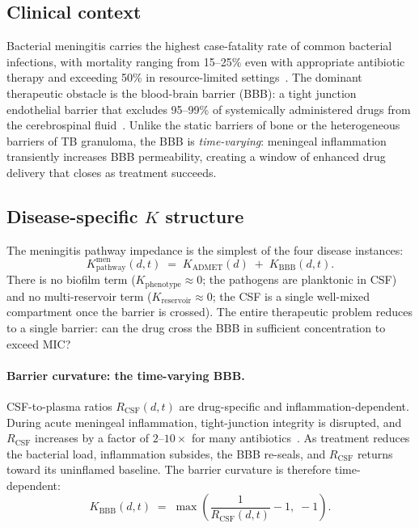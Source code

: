 \documentclass[11pt]{article}
\theoremstyle{plain}
\theoremstyle{definition}
\newcommand{\Kpath}{K_{\mathrm{pathway}}}
\newcommand{\Kpheno}{K_{\mathrm{phenotype}}}
\newcommand{\Kres}{K_{\mathrm{reservoir}}}
\newcommand{\Kadmet}{K_{\mathrm{ADMET}}}
\begin{document}
\subsection{Clinical context}
\label{sec:men-context}

Bacterial meningitis carries the highest case-fatality rate of
common bacterial infections, with mortality ranging from 15--25\%
even with appropriate antibiotic therapy and exceeding 50\% in
resource-limited settings~\cite{vandeBeek2006}. The dominant
therapeutic obstacle is the blood-brain barrier (BBB): a tight
junction endothelial barrier that excludes 95--99\% of
systemically administered drugs from the cerebrospinal
fluid~\cite{Nau2010}. Unlike the static barriers of bone or the
heterogeneous barriers of TB granuloma, the BBB is
\emph{time-varying}: meningeal inflammation transiently increases
BBB permeability, creating a window of enhanced drug delivery that
closes as treatment succeeds.

\subsection{Disease-specific \texorpdfstring{$K$}{K} structure}
\label{sec:men-k}

The meningitis pathway impedance is the simplest of the four
disease instances:
\begin{equation}
  \label{eq:k-men}
  \Kpath^{\mathrm{men}}(d, t) \;=\;
  \Kadmet(d) \;+\; K_{\mathrm{BBB}}(d, t).
\end{equation}
There is no biofilm term ($\Kpheno \approx 0$; the pathogens are
planktonic in CSF) and no multi-reservoir term ($\Kres \approx 0$;
the CSF is a single well-mixed compartment once the barrier is
crossed). The entire therapeutic problem reduces to a single
barrier: can the drug cross the BBB in sufficient concentration
to exceed MIC?

\paragraph{Barrier curvature: the time-varying BBB.}
CSF-to-plasma ratios $R_{\mathrm{CSF}}(d, t)$ are drug-specific
and inflammation-dependent. During acute meningeal inflammation,
tight-junction integrity is disrupted, and $R_{\mathrm{CSF}}$
increases by a factor of $2$--$10\times$ for many
antibiotics~\cite{Nau2010}. As treatment reduces the bacterial
load, inflammation subsides, the BBB re-seals, and
$R_{\mathrm{CSF}}$ returns toward its uninflamed baseline. The
barrier curvature is therefore time-dependent:
\begin{equation}
  \label{eq:k-bbb}
  K_{\mathrm{BBB}}(d, t) \;=\;
  \max\!\left(\frac{1}{R_{\mathrm{CSF}}(d, t)} - 1,\; -1\right).
\end{equation}
\end{document}
